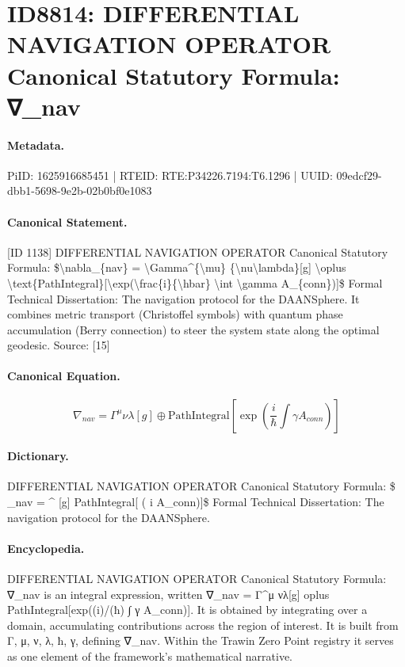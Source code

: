\section*{ID8814: DIFFERENTIAL NAVIGATION OPERATOR Canonical Statutory Formula: ∇\_nav}
\paragraph{Metadata.}
PiID: 1625916685451 | RTEID: RTE:P34226.7194:T6.1296 | UUID: 09edcf29-dbb1-5698-9e2b-02b0bf0e1083

\paragraph{Canonical Statement.}
[ID 1138] DIFFERENTIAL NAVIGATION OPERATOR Canonical Statutory Formula: \$\textbackslash{}nabla\_\{nav\} = \textbackslash{}Gamma\textasciicircum{}\{\textbackslash{}mu\} \{\textbackslash{}nu\textbackslash{}lambda\}[g] \textbackslash{}oplus \textbackslash{}text\{PathIntegral\}[\textbackslash{}exp(\textbackslash{}frac\{i\}\{\textbackslash{}hbar\} \textbackslash{}int \textbackslash{}gamma A\_\{conn\})]\$ Formal Technical Dissertation: The navigation protocol for the DAANSphere. It combines metric transport (Christoffel symbols) with quantum phase accumulation (Berry connection) to steer the system state along the optimal geodesic. Source: [15]

\paragraph{Canonical Equation.}
\[
\nabla_{nav} = \Gamma^{\mu} {\nu\lambda}[g] \oplus \text{PathIntegral}[\exp(\frac{i}{\hbar} \int \gamma A_{conn})]
\]

\paragraph{Dictionary.}
DIFFERENTIAL NAVIGATION OPERATOR Canonical Statutory Formula: \$ \_nav = \textasciicircum{} [g] PathIntegral[ ( i A\_conn)]\$ Formal Technical Dissertation: The navigation protocol for the DAANSphere.

\paragraph{Encyclopedia.}
DIFFERENTIAL NAVIGATION OPERATOR Canonical Statutory Formula: ∇\_nav is an integral expression, written ∇\_nav = Γ\textasciicircum{}μ νλ[g] oplus PathIntegral[exp((i)/(ħ) ∫ γ A\_conn)]. It is obtained by integrating over a domain, accumulating contributions across the region of interest. It is built from Γ, μ, ν, λ, ħ, γ, defining ∇\_nav. Within the Trawin Zero Point registry it serves as one element of the framework's mathematical narrative.
